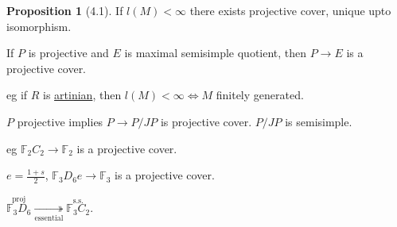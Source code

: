\documentclass{article}
\theoremstyle{definition}
\newtheorem{proposition}[theorem]{Proposition}
\begin{document}
\begin{proposition}
    [4.1] If \(l(M) < \infty\) there exists projective cover, unique upto isomorphism.

    If \(P\) is projective and \(E\) is maximal semisimple quotient, then \(P \to E\) is a projective cover.

    eg if \(R\) is \underline{artinian}, then \(l(M) < \infty \iff M\) finitely generated.

    \(P\) projective implies \(P \to P / JP\) is projective cover. \(P / JP\) is semisimple.

    eg \(\mathbb{F}_2 C_2 \to \mathbb{F}_2\) is a projective cover.

    \(e = \frac{1+s}{2}\), \(\mathbb{F}_3 D_6 e \to \mathbb{F}_3\) is a projective cover.

    \(\overset{\text{proj}}{\mathbb{F}_3 D_6} \underset{\text{essential}}{\twoheadrightarrow} \overset{\text{s.s.}}{\mathbb{F}_3 C_2}\).

\end{proposition}
\end{document}
